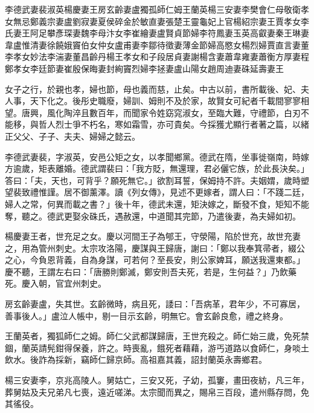 
\begin{pinyinscope}

 李德武妻裴淑英楊慶妻王房玄齡妻盧獨孤師仁姆王蘭英楊三安妻李樊會仁母敬衛孝女無忌鄭義宗妻盧劉寂妻夏侯碎金於敏直妻張楚王靈龜妃上官楊紹宗妻王賈孝女李氏妻王阿足攀彥琛妻魏李母汴女李崔繪妻盧賢貞節婦李符鳳妻玉英高叡妻秦王琳妻韋盧惟清妻徐饒娥竇伯女仲女盧甫妻李鄒待徵妻薄金節婦高愍女楊烈婦賈直言妻董李孝女妙法李湍妻董昌齡丹楊王孝女和子段居貞妻謝楊含妻蕭韋雍妻蕭衡方厚妻程鄭孝女李廷節妻崔殷保晦妻封絢竇烈婦李拯妻盧山陽女趙周迪妻硃延壽妻王



 女子之行，於親也孝，婦也節，母也義而慈，止矣。中古以前，書所載後、妃、夫人事，天下化之。後彤史職廢，婦訓、姆則不及於家，故賢女可紀者千載間寥寥相望。唐興，風化陶淬且數百年，而聞家令姓窈窕淑女，至臨大難，守禮節，白刃不能移，與哲人烈士爭不朽名，寒如霜雪，亦可貴矣。今採獲尤顯行者著之篇，以緒正父父、子子、夫夫、婦婦之懿云。



 李德武妻裴，字淑英，安邑公矩之女，以孝聞鄉黨。德武在隋，坐事徙嶺南，時嫁方逾歲，矩表離婚。德武謂裴曰：「我方貶，無還理，君必儷它族，於此長決矣。」答曰：「夫，天也，可背乎？願死無它。」欲割耳誓，保姆持不許。夫姻媦，歲時塑望裴致禮惟謹。居不御薰澤。讀《列女傳》，見述不更嫁者，謂人曰：「不踐二廷，婦人之常，何異而載之書？」後十年，德武未還，矩決嫁之，斷發不食，矩知不能奪，聽之。德武更娶汆硃氏，遇赦還，中道聞其完節，乃遣後妻，為夫婦如初。



 楊慶妻王者，世充足之女。慶以河間王子為郇王，守滎陽，陷於世充，故世充妻之，用為管州刺史。太宗攻洛陽，慶謀與王歸唐，謝曰：「鄭以我奉箕帚者，綴公之心，今負恩背義，自為身謀，可若何？至長安，則公家婢耳，願送我還東都。」慶不聽，王謂左右曰：「唐勝則鄭滅，鄭安則吾夫死，若是，生何益？」乃飲藥死。慶入朝，官宜州刺史。



 房玄齡妻盧，失其世。玄齡微時，病且死，諉曰：「吾病革，君年少，不可寡居，善事後人。」盧泣人帳中，剔一目示玄齡，明無它。會玄齡良愈，禮之終身。



 王蘭英者，獨狐師仁之姆。師仁父武都謀歸唐，王世充殺之。師仁始三歲，免死禁錮，蘭英請髡鉗得保養，許之。時喪亂，餓死者藉藉，游丐道路以食師仁，身啖土飲水。後詐為採新，竊師仁歸京師。高祖嘉其義，詔封蘭英永壽鄉君。



 楊三安妻李，京兆高陵人。舅姑亡，三安又死，子幼，孤窶，畫田夜紡，凡三年，葬舅姑及夫兄弟凡七喪，遠近嗟涕。太宗聞而異之，賜帛三百段，遣州縣存問，免其徭役。




\end{pinyinscope}
